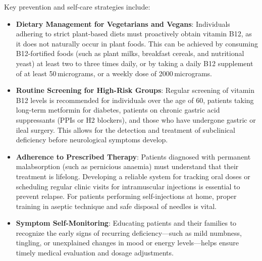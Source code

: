 Key prevention and self-care strategies include:
\begin{itemize}
    \item \textbf{Dietary Management for Vegetarians and Vegans}: Individuals adhering to strict plant-based diets must proactively obtain vitamin B12, as it does not naturally occur in plant foods. This can be achieved by consuming B12-fortified foods (such as plant milks, breakfast cereals, and nutritional yeast) at least two to three times daily, or by taking a daily B12 supplement of at least 50\,micrograms, or a weekly dose of 2000\,micrograms.
    \item \textbf{Routine Screening for High-Risk Groups}: Regular screening of vitamin B12 levels is recommended for individuals over the age of 60, patients taking long-term metformin for diabetes, patients on chronic gastric acid suppressants (PPIs or H2 blockers), and those who have undergone gastric or ileal surgery. This allows for the detection and treatment of subclinical deficiency before neurological symptoms develop.
    \item \textbf{Adherence to Prescribed Therapy}: Patients diagnosed with permanent malabsorption (such as pernicious anaemia) must understand that their treatment is lifelong. Developing a reliable system for tracking oral doses or scheduling regular clinic visits for intramuscular injections is essential to prevent relapse. For patients performing self-injections at home, proper training in aseptic technique and safe disposal of needles is vital.
    \item \textbf{Symptom Self-Monitoring}: Educating patients and their families to recognize the early signs of recurring deficiency---such as mild numbness, tingling, or unexplained changes in mood or energy levels---helps ensure timely medical evaluation and dosage adjustments.
\end{itemize}

